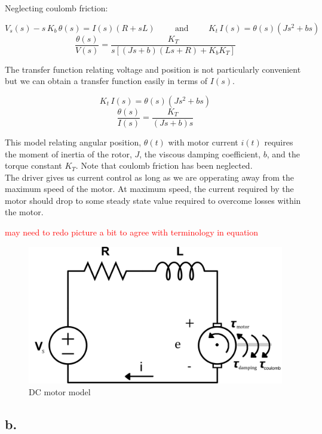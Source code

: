 \documentclass{article}
\newcommand{\xxx}[1]{\textcolor{red}{#1}}
\theoremstyle{plain}
\theoremstyle{definition}
\theoremstyle{remark}
\begin{document}
Neglecting coulomb friction:

$$ V_{s}(s) - s \, K_{b} \, \theta (s) = I(s) (R+sL) \hspace{1cm} \text{and} \hspace{1cm} K_{t} \, I(s) = \theta(s)(Js^2+bs) $$
$$ \frac{\theta(s)}{V(s)} = \frac{K_T}{s\left[ (Js + b)(Ls + R)+K_bK_T \right]} $$

The transfer function relating voltage and position is not particularly convenient but we can obtain a transfer function easily in terms of $I(s)$.

$$ K_{t} \, I(s) = \theta(s)(Js^2+bs) $$
$$ \frac{\theta(s)}{I(s)} = \frac{K_T}{(Js + b)s} $$

This model relating angular position, $\theta(t)$ with motor current $i(t)$ requires the moment of inertia of the rotor, $J$, the viscous damping coefficient, $b$, and the torque constant $K_T$.  Note that coulomb friction has been neglected. \\

The driver gives us current control as long as we are opperating away from the maximum speed of the motor.  At maximum speed, the current required by the motor should drop to some steady state value required to overcome losses within the motor.

\xxx{may need to redo picture a bit to agree with terminology in equation}
\begin{figure}
\begin{center}
\includegraphics[width = 13cm]{dcmotor.png}
\caption{DC motor model}
\label{q2_a1}
\end{center}
\end{figure}

\subsection*{b.}
\end{document}
